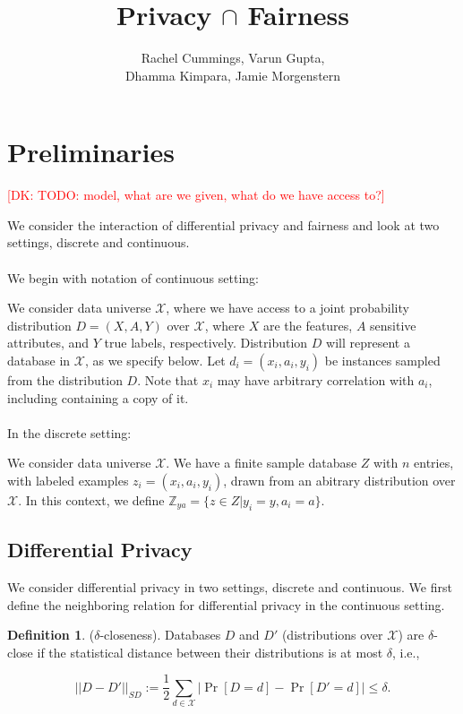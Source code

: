 \documentclass[format = sigconf]{acmart}
\newcommand{\dk}[1]{\textcolor{red}{[DK: #1]}}
\newcommand{\X}{\mathcal{X}}
\newcommand{\1}{\mathbbm{1}}
\newcommand{\Z}{\mathbb{Z}}
\newcommand{\del}{\delta}
\newcommand{\zya}{\Z_{ya}}
\theoremstyle{definition}
\newtheorem{defn}{Definition}[section]
\begin{document}

\title{Privacy $\cap$ Fairness}
{\author{Rachel Cummings, Varun Gupta, \\Dhamma Kimpara, Jamie Morgenstern}}
\maketitle
\section{Preliminaries}
\dk{TODO: model, what are we given, what do we have access to?}

We consider the interaction of differential privacy and fairness and look at two settings, discrete and continuous. \\ \\
We begin with notation of continuous setting:

We consider data universe $\X$, where we have access to a joint probability distribution $D = (X, A, Y)$ over $\X$, where $X$ are the features, $A$ sensitive attributes, and $Y$ true labels, respectively. Distribution $D$ will represent a database in $\X$, as we specify below. Let $d_i = (x_i, a_i, y_i)$ be instances sampled from the distribution $D$. Note that $x_i$ may have arbitrary correlation with $a_i$, including containing a copy of it.
 \\ \\
In the discrete setting:

We consider data universe $\X$. We have a finite sample database $Z$ with $n$ entries, with labeled examples $z_i = (x_i, a_i, y_i)$, drawn from an abitrary distribution over $\X$. In this context, we define $\zya = \{z \in Z | y_i =y, a_i = a\}$.
\subsection{Differential Privacy}
We consider differential privacy in two settings, discrete and continuous.
We first define the neighboring relation for differential privacy in the continuous setting.

\begin{defn}
	($\del$-closeness). Databases  $D$ and $D'$ (distributions over $\mathcal{X}$) are $\del$-close if the statistical distance between their distributions is at most $\del$, i.e.,

	$$ ||D-D'||_{\textit{SD}} :=\frac{1}{2}\sum_{d\in \mathcal{X}} |\Pr[D=d] - \Pr[D'=d]| \leq \del.$$
\end{defn}
\end{document}
